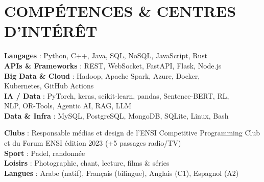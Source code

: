 \section{COMPÉTENCES \& CENTRES D'INTÉRÊT}
\small
\begin{minipage}[t]{0.60\textwidth}
     \textbf{Langages} : Python, C++, Java, SQL, NoSQL, JavaScript, Rust \\ \vspace{2pt}\textbf{APIs \& Frameworks} : REST, WebSocket, FastAPI, Flask, Node.js \\ \vspace{2pt}\textbf{Big Data \& Cloud} : Hadoop, Apache Spark, Azure, Docker,\\ Kubernetes, GitHub Actions \\ \vspace{2pt}\textbf{IA / Data} : PyTorch, keras, scikit-learn, pandas, Sentence-BERT, RL, \\ NLP, OR-Tools, Agentic AI, RAG, LLM \\ \vspace{2pt}\textbf{Data \& Infra} : MySQL, PostgreSQL, MongoDB, SQLite, Linux, Bash 
\end{minipage}\hfill
\begin{minipage}[t]{0.37\textwidth}
     \textbf{Clubs} : Responsable médias et design de l'ENSI Competitive Programming Club et du Forum ENSI édition 2023 (+5 passages radio/TV) \\ \vspace{2pt}\textbf{Sport} : Padel, randonnée \\ \vspace{2pt}\textbf{Loisirs} : Photographie, chant, lecture, films \& séries
     \\ \vspace{2pt}\textbf{Langues} : Arabe (natif), Français (bilingue), Anglais (C1), Espagnol (A2)
\end{minipage}


